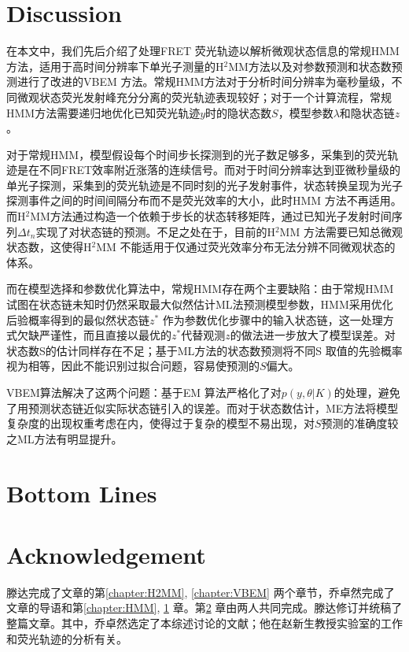 \documentclass[11pt, a4paper]{article}
\begin{document}
\section{Discussion}\label{chapter:Discussion}
在本文中，我们先后介绍了处理FRET 荧光轨迹以解析微观状态信息的常规HMM方法，适用于高时间分辨率下单光子测量的H$^2$MM方法以及对参数预测和状态数预测进行了改进的VBEM 方法。常规HMM方法对于分析时间分辨率为毫秒量级，不同微观状态荧光发射峰充分分离的荧光轨迹表现较好；对于一个计算流程，常规HMM方法需要递归地优化已知荧光轨迹$y$时的隐状态数$S$，模型参数$\lambda$和隐状态链$z$。

对于常规HMM，模型假设每个时间步长探测到的光子数足够多，采集到的荧光轨迹是在不同FRET效率附近涨落的连续信号。而对于时间分辨率达到亚微秒量级的单光子探测，采集到的荧光轨迹是不同时刻的光子发射事件，状态转换呈现为光子探测事件之间的时间间隔分布而不是荧光效率的大小，此时HMM 方法不再适用。而H$^2$MM方法通过构造一个依赖于步长的状态转移矩阵，通过已知光子发射时间序列$\Delta t_n$实现了对状态链的预测。不足之处在于，目前的H$^2$MM 方法需要已知总微观状态数，这使得H$^2$MM 不能适用于仅通过荧光效率分布无法分辨不同微观状态的体系。

而在模型选择和参数优化算法中，常规HMM存在两个主要缺陷：由于常规HMM 试图在状态链未知时仍然采取最大似然估计ML法预测模型参数，HMM采用优化后验概率得到的最似然状态链$z^*$ 作为参数优化步骤中的输入状态链，这一处理方式欠缺严谨性，而且直接以最优的$z^*$代替观测$z$的做法进一步放大了模型误差。对状态数S的估计同样存在不足；基于ML方法的状态数预测将不同S 取值的先验概率视为相等，因此不能识别过拟合问题，容易使预测的$S$偏大。

VBEM算法解决了这两个问题：基于EM 算法严格化了对$p(y,\theta|K)$的处理，避免了用预测状态链近似实际状态链引入的误差。而对于状态数估计，ME方法将模型复杂度的出现权重考虑在内，使得过于复杂的模型不易出现，对$S$预测的准确度较之ML方法有明显提升。

\section{Bottom Lines}\label{chapter:BottomLines}

\section{Acknowledgement}
    滕达完成了文章的第\ref{chapter:H2MM}, \ref{chapter:VBEM} 两个章节，乔卓然完成了文章的导语和第\ref{chapter:HMM}, \ref{chapter:Discussion} 章。第\ref{chapter:BottomLines} 章由两人共同完成。滕达修订并统稿了整篇文章。其中，乔卓然选定了本综述讨论的文献；他在赵新生教授实验室的工作和荧光轨迹的分析有关。


\small


\end{document}
